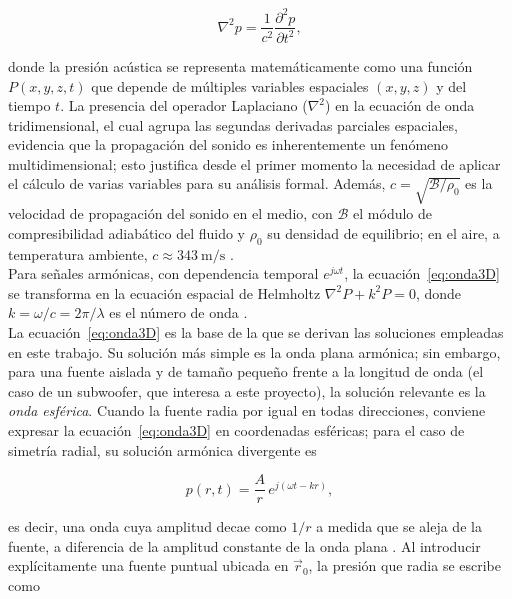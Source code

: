 \begin{equation}
\nabla^2 p = \frac{1}{c^2}\frac{\partial^2 p}{\partial t^2},
\label{eq:onda3D}
\end{equation}

donde la presión acústica se representa matemáticamente como una función \(P(x,y,z,t)\) que depende de múltiples variables espaciales \((x,y,z)\) y del tiempo \(t\). La presencia del operador Laplaciano (\(\nabla^2\)) en la ecuación de onda tridimensional, el cual agrupa las segundas derivadas parciales espaciales, evidencia que la propagación del sonido es inherentemente un fenómeno multidimensional; esto justifica desde el primer momento la necesidad de aplicar el cálculo de varias variables para su análisis formal. Además, \(c=\sqrt{\mathcal{B}/\rho_0}\) es la
velocidad de propagación del sonido en el medio, con \(\mathcal{B}\) el
módulo de compresibilidad adiabático del fluido y \(\rho_0\) su densidad
de equilibrio; en el aire, a temperatura ambiente, $c\approx
343\ \text{m/s}$ \cite{kinsler2000,rossing2014handbook}.\\

Para señales
armónicas, con dependencia temporal \(e^{j\omega t}\), la
ecuación~\eqref{eq:onda3D} se transforma en la ecuación espacial de
Helmholtz \(\nabla^2 P + k^2 P = 0\), donde \(k=\omega/c=2\pi/\lambda\) es
el número de onda \cite{pierce2014handbook}.\\

La ecuación~\eqref{eq:onda3D} es la base de la que se derivan las
soluciones empleadas en este trabajo. Su solución más simple es la
onda plana armónica; sin embargo, para una fuente aislada y de tamaño
pequeño frente a la longitud de onda (el caso de un subwoofer, que
interesa a este proyecto), la solución relevante es la \emph{onda
esférica}. Cuando la fuente radia por igual en todas direcciones,
conviene expresar la ecuación~\eqref{eq:onda3D} en coordenadas
esféricas; para el caso de simetría radial, su solución armónica
divergente es

\begin{equation}
p(r,t) = \frac{A}{r}\, e^{j(\omega t - kr)},
\label{eq:onda_esferica}
\end{equation}

es decir, una onda cuya amplitud decae como \(1/r\) a medida que se aleja
de la fuente, a diferencia de la amplitud constante de la onda plana
\cite{kinsler2000}. Al introducir explícitamente una fuente puntual
ubicada en \(\vec{r}_0\), la presión que radia se escribe como

